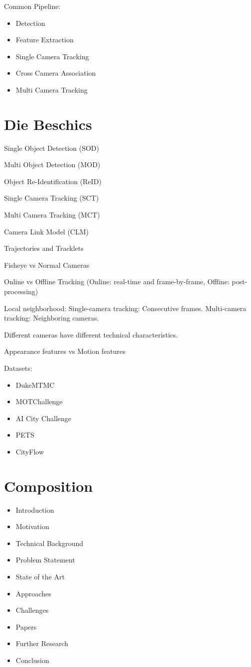 Common Pipeline:
\begin{itemize}
    \item Detection
    \item Feature Extraction
    \item Single Camera Tracking
    \item Cross Camera Association
    \item Multi Camera Tracking
\end{itemize}

\section{Die Beschics}

Single Object Detection (SOD)

Multi Object Detection (MOD)

Object Re-Identification (ReID)

Single Camera Tracking (SCT)

Multi Camera Tracking (MCT)

Camera Link Model (CLM)

Trajectories and Tracklets

Fisheye vs Normal Cameras

Online vs Offline Tracking (Online: real-time and frame-by-frame, Offline: post-processing)

Local neighborhood:
Single-camera tracking: Consecutive frames.
Multi-camera tracking: Neighboring cameras.

Different cameras have different technical characteristics.

Appearance features vs Motion features

Datasets:
\begin{itemize}
    \item DukeMTMC
    \item MOTChallenge
    \item AI City Challenge
    \item PETS
    \item CityFlow
\end{itemize}

\section{Composition}

\begin{itemize}
    \item Introduction
    \item Motivation
    \item Technical Background
    \item Problem Statement
    \item State of the Art
    \item Approaches
    \item Challenges
    \item Papers
    \item Further Research
    \item Conclusion
\end{itemize}

